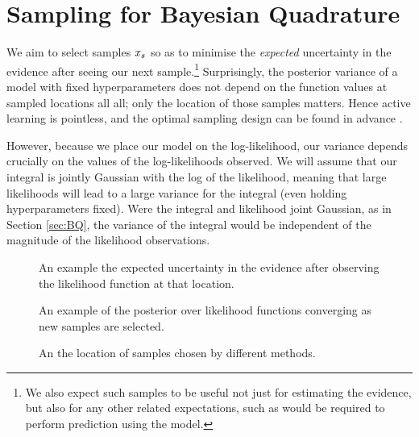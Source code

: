 \documentclass{article}
\begin{document}
\section{Sampling for Bayesian Quadrature}

We aim to select samples $\lfv_s$ so as to minimise the \textit{expected} uncertainty in the evidence after seeing our next sample.\footnote{We also expect such samples to be useful not just for estimating the evidence, but also for any other related expectations, such as would be required to perform prediction using the model.}
Surprisingly, the posterior variance of a \gpb model with fixed hyperparameters does not depend on the function values at sampled locations all all; only the location of those samples matters. Hence active learning is pointless, and the optimal sampling design can be found in advance \cite{minka2000dqr}.

However, because we place our \gpb model on the log-likelihood, our variance depends crucially on the values of the log-likelihoods observed. We will assume that our integral is jointly Gaussian with the log of the likelihood, meaning that large likelihoods will lead to a large variance for the integral (even holding hyperparameters fixed). Were the integral and likelihood joint Gaussian, as in Section \ref{sec:BQ}, the variance of the integral would be independent of the magnitude of the likelihood observations.

 \begin{figure}
 \centering
 \caption{An example the expected uncertainty in the evidence after observing the likelihood function at that location.}
 \label{fig:eue}
 \end{figure}
 
\begin{figure}
\centering
\caption{An example of the posterior over likelihood functions converging as new samples are selected.}
\label{fig:active_learning}
\end{figure}

\begin{figure}
\centering
\caption{An the location of samples chosen by different methods.}
\label{fig:sample_paths}
\end{figure}
\end{document}
